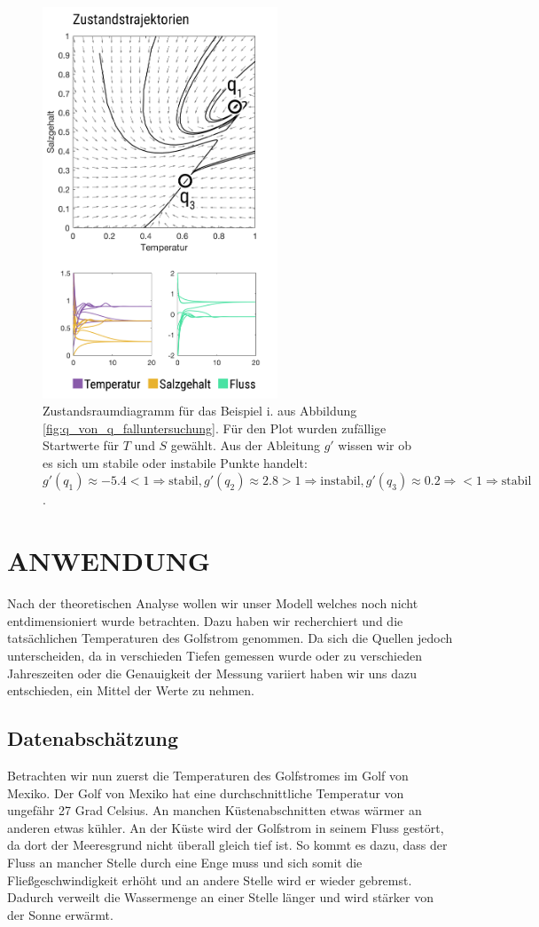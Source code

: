 \documentclass[a4paper,twoside]{article}
\begin{document}
	\begin{figure}[!h]
  		\centering
 		\includegraphics[width=7cm]{../Diagramme/zustandsdiagram.png}
  		\caption{Zustandsraumdiagramm für das Beispiel i. aus Abbildung \ref{fig:q_von_q_falluntersuchung}. Für den Plot wurden zufällige Startwerte für \(T\) und \(S\) gewählt. Aus der Ableitung \(g'\) wissen wir ob es sich um stabile oder instabile Punkte handelt: \(g'(q_1) \approx -5.4 < 1 \Rightarrow \textrm{stabil}, g'(q_2) \approx 2.8 > 1 \Rightarrow \textrm{instabil}, g'(q_3) \approx 0.2 \Rightarrow < 1 \Rightarrow \textrm{stabil} \). }
  		\label{fig:Zustandsraumdiagramm}
	\end{figure}	
	
	\section{\uppercase{Anwendung}}\label{sec:Anwendung}
	\noindent Nach der theoretischen Analyse wollen wir unser Modell welches noch nicht entdimensioniert wurde betrachten. Dazu haben wir recherchiert und die tatsächlichen Temperaturen des Golfstrom genommen. Da sich die Quellen jedoch unterscheiden, da in verschieden Tiefen gemessen wurde oder zu verschieden Jahreszeiten oder die Genauigkeit der Messung variiert haben wir uns dazu entschieden, ein Mittel der Werte zu nehmen.
	
	\subsection{Datenabschätzung} \label{Datenabschaetzung}
	\noindent Betrachten wir nun zuerst die Temperaturen des Golfstromes im Golf von Mexiko. Der Golf von Mexiko hat eine durchschnittliche Temperatur von ungefähr 27 Grad Celsius. An manchen Küstenabschnitten etwas wärmer an anderen etwas kühler. An der Küste wird der Golfstrom in seinem Fluss gestört, da dort der Meeresgrund nicht überall gleich tief ist. So kommt es dazu, dass der Fluss an mancher Stelle durch eine Enge muss und sich somit die Fließgeschwindigkeit erhöht und an andere Stelle wird er wieder gebremst. Dadurch verweilt die Wassermenge an einer Stelle länger und wird stärker von der Sonne erwärmt. 
	
\end{document}
